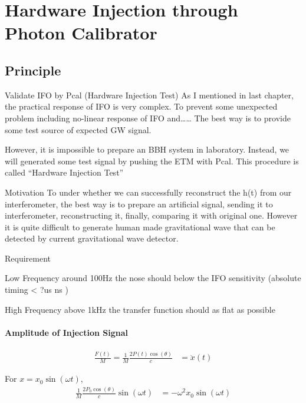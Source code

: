 
\chapter{Hardware Injection through Photon Calibrator}
\section{Principle}
 


Validate IFO by Pcal (Hardware Injection Test)
As I mentioned in last chapter, the practical response of IFO is very complex. To prevent some unexpected problem including no-linear response of IFO and……  
The best way is to provide some test source of expected GW signal.

However, it is impossible to prepare an BBH system in laboratory. Instead, we will generated some test signal by pushing the ETM with Pcal. This procedure is called “Hardware Injection Test”


Motivation
To under whether we can successfully reconstruct the h(t) from our interferometer, the best way is to prepare an artificial signal, sending it to interferometer, reconstructing it, finally, comparing it with original one. However it is quite difficult to generate human made gravitational wave that can be detected by current gravitational wave detector.

Requirement

Low Frequency
around 100Hz  the nose should below the IFO sensitivity
(absolute timing < ?us ns )

High Frequency
above 1kHz    the transfer function should as flat as possible


\subsubsection{Amplitude of Injection Signal}


\begin{align}
    \frac{F(t)}{M}=\frac{1}{M} \frac{2 P(t) \cos(\theta)}{c} &= \ddot{x}(t)
\end{align}

For $x=x_0 \sin(\omega t)$,
\begin{align}
    \frac{1}{M} \frac{2 P_0 \cos(\theta)}{c} \sin(\omega t) &=  -\omega^2 x_0 \sin(\omega t)
\end{align}

